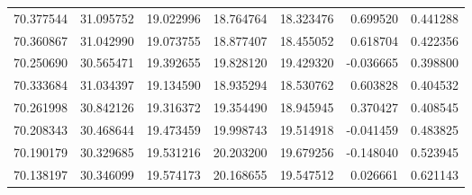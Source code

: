 \begin{tabular}{rrrrrrr}
 70.377544 &  31.095752 &         19.022996 &         18.764764 &         18.323476 &  0.699520 &  0.441288 \\
 70.360867 &  31.042990 &         19.073755 &         18.877407 &         18.455052 &  0.618704 &  0.422356 \\
 70.250690 &  30.565471 &         19.392655 &         19.828120 &         19.429320 & -0.036665 &  0.398800 \\
 70.333684 &  31.034397 &         19.134590 &         18.935294 &         18.530762 &  0.603828 &  0.404532 \\
 70.261998 &  30.842126 &         19.316372 &         19.354490 &         18.945945 &  0.370427 &  0.408545 \\
 70.208343 &  30.468644 &         19.473459 &         19.998743 &         19.514918 & -0.041459 &  0.483825 \\
 70.190179 &  30.329685 &         19.531216 &         20.203200 &         19.679256 & -0.148040 &  0.523945 \\
 70.138197 &  30.346099 &         19.574173 &         20.168655 &         19.547512 &  0.026661 &  0.621143 \\
\bottomrule
\end{tabular}
